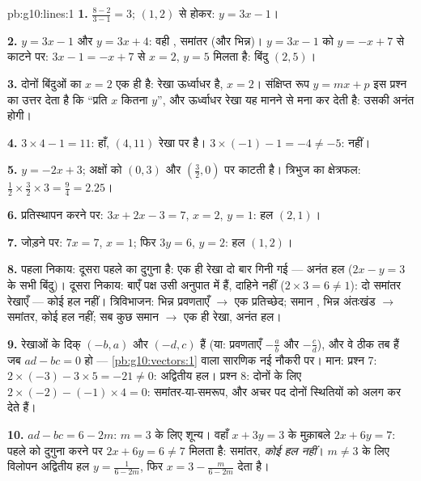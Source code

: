 \begin{solution}{pb:g10:lines:1}
\textbf{1.}  $\frac{8 - 2}{3 - 1} = 3$; $(1, 2)$ से होकर: $y = 3x - 1$।

\textbf{2.} $y = 3x - 1$ और $y = 3x + 4$: वही , समांतर (और भिन्न)। $y = 3x - 1$ को $y = -x + 7$
से काटने पर: $3x - 1 = -x + 7$ से $x = 2$, $y = 5$ मिलता है: बिंदु $(2, 5)$।

\textbf{3.} दोनों बिंदुओं का $x = 2$ एक ही है: रेखा ऊर्ध्वाधर है, 
$x = 2$। संक्षिप्त रूप $y = mx + p$ इस प्रश्न का उत्तर देता है कि ``प्रति $x$
कितना $y$'', और ऊर्ध्वाधर रेखा यह मानने से मना कर देती है: उसकी 
अनंत होगी।

\textbf{4.} $3 \times 4 - 1 = 11$: हाँ, $(4, 11)$ रेखा पर है। $3 \times (-1) - 1 = -4 \neq -5$: नहीं।

\textbf{5.} $y = -2x + 3$; अक्षों को $(0, 3)$ और $\left(\frac32, 0\right)$ पर काटती है। त्रिभुज का
क्षेत्रफल: $\frac12 \times \frac32 \times 3 = \frac94 = 2.25$।

\textbf{6.} प्रतिस्थापन करने पर: $3x + 2x - 3 = 7$, $x = 2$, $y = 1$: हल $(2, 1)$।

\textbf{7.} जोड़ने पर: $7x = 7$, $x = 1$; फिर $3y = 6$, $y = 2$: हल $(1, 2)$।

\textbf{8.} पहला निकाय: दूसरा  पहले का दुगुना है: एक ही रेखा दो बार
गिनी गई --- अनंत हल ($2x - y = 3$ के सभी बिंदु)। दूसरा निकाय: बाएँ पक्ष उसी अनुपात
में हैं, दाहिने नहीं ($2 \times 3 = 6 \neq 1$): दो समांतर रेखाएँ --- कोई हल नहीं। त्रिविभाजन:
भिन्न प्रवणताएँ $\to$ एक प्रतिच्छेद; समान , भिन्न अंतःखंड $\to$
समांतर, कोई हल नहीं; सब कुछ समान $\to$ एक ही रेखा, अनंत हल।

\textbf{9.} रेखाओं के दिक्  $(-b, a)$ और $(-d, c)$ हैं (या: प्रवणताएँ $-\frac ab$ और
$-\frac cd$), और वे  ठीक तब हैं जब $ad - bc = 0$ हो --- \cref{pb:g10:vectors:1} वाला सारणिक नई नौकरी
पर। मान: प्रश्न 7: $2 \times (-3) - 3 \times 5 = -21 \neq 0$: अद्वितीय हल। प्रश्न 8: दोनों के लिए $2 \times (-2) - (-1) \times 4 = 0$:
समांतर-या-समरूप, और अचर पद दोनों स्थितियों को अलग कर देते हैं।

\textbf{10.} $ad - bc = 6 - 2m$: $m = 3$ के लिए शून्य। वहाँ $x + 3y = 3$ के मुक़ाबले $2x + 6y = 7$: पहले
को दुगुना करने पर $2x + 6y = 6 \neq 7$ मिलता है: समांतर, \emph{कोई हल नहीं}। $m \neq 3$ के लिए
विलोपन अद्वितीय हल $y = \frac{1}{6 - 2m}$, फिर $x = 3 - \frac{m}{6 - 2m}$ देता है।


\end{solution}
